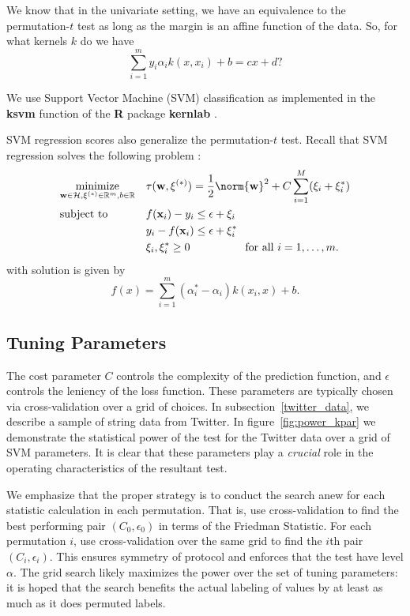 We know that in the univariate setting, we have an equivalence to the
permutation-$t$ test as long as the margin is an affine function of
the data.  So, for what kernels $k$ do we have 
\begin{equation}
\sum_{i=1}^m y_i \alpha_i k(x, x_i) + b = cx + d?
\end{equation}

We use Support Vector Machine (SVM) classification 
as implemented in the {\bf ksvm} function of the {\bf R}
\cite{cran} package {\bf kernlab} \cite{kernlab}.

SVM regression scores also generalize the permutation-$t$ test.
Recall that SVM regression solves the following problem \cite{scholkopf2002learning}:
\begin{equation*}
\begin{aligned}
& \underset{\mathbf{w}\in\mathcal{H},\mathbf{\xi}^{(*)}\in\mathbb{R}^m,b\in\mathbb{R}}{\text{minimize}}
& &\tau(\mathbf{w},\mathbf{\xi}^{(*)})=\frac{1}{2}\norm{\mathbf{w}}^2+C\sum_{i=1}^M(\xi_i+\xi_i^*) \\
& \text{subject to}
& & f(\mathbf{x}_i)-y_i \leq \epsilon +\xi_i\\
&&& y_i-f(\mathbf{x}_i) \leq \epsilon+\xi_i^* \\
&&& \xi_i,\xi_i^*\geq0 \qquad \qquad \quad \text{for all } i=1,\ldots,m.
\end{aligned}
\end{equation*}
with solution is given by
\begin{equation*}
  f(x)=\sum_{i=1}^m(\alpha_i^*-\alpha_i)k(x_i,x)+b.
\end{equation*}
\subsection{Tuning Parameters}

The cost parameter $C$ controls the complexity of the prediction
function, and $\epsilon$ controls the leniency of the loss function.
These parameters are typically chosen via cross-validation over a grid
of choices.  In subsection~\ref{twitter_data}, we describe a sample of
string data from Twitter.  In figure~\ref{fig:power_kpar} we
demonstrate the statistical power of the test for the Twitter data
over a grid of SVM parameters.  It is clear that these parameters play
a \emph{crucial} role in the operating characteristics of the
resultant test.

We emphasize that the proper strategy is to conduct the search anew
for each statistic calculation in each permutation.  That is, use cross-validation to
find the best performing pair $(C_0, \epsilon_0)$ in terms of the
Friedman Statistic.  For each permutation $i$, use cross-validation
over the same grid to find the $i$th pair $(C_i, \epsilon_i)$.  This
ensures symmetry of protocol and enforces that the test have level
$\alpha$.  The grid search likely maximizes the power over the set of
tuning parameters: it is hoped that the search benefits the actual
labeling of values by at least as much as it does permuted labels.

